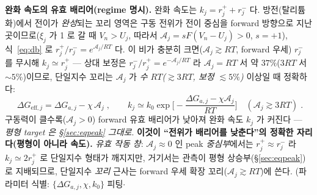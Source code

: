 \documentclass[11pt,a4paper]{article}
\newcommand{\eff}{\mathrm{eff}}
\begin{document}
\textbf{완화 속도의 유효 배리어(regime 명시).} 완화 속도는 $k_j=r_j^++r_j^-$ 다. 방전(탈리튬화)에서 전이가
\emph{완성}되는 꼬리 영역은 구동 전위가 전이 중심을 forward 방향으로 지난 곳이므로($\xi_j$ 가 1 로 갈 때
$V_n>U_j$, 따라서 $\mathcal A_j=sF(V_n-U_j)>0$, $s=+1$), 식~\eqref{eq:db} 로 $r_j^+/r_j^-=e^{\mathcal A_j/RT}$ 다.
이 비가 충분히 크면($\mathcal A_j\gtrsim RT$, forward 우세) $r_j^-$ 를 무시해 $k_j\simeq r_j^+$ — 상대 보정은
$r_j^-/r_j^+=e^{-\mathcal A_j/RT}$ 라 $\mathcal A_j=RT$ 서 약 $37\%$($3RT$ 서 $\sim5\%$)이므로, 단일지수 꼬리는 $\mathcal A_j$ 가
\emph{수 $RT$($\gtrsim3RT$, 보정 $\lesssim5\%$)} 이상일 때 정확하다:
\begin{equation}
\boxed{\;\Delta G_{\eff,j}=\Delta G_{a,j}-\chi\,\mathcal A_j\;,\qquad
k_j\simeq k_0\exp\!\Big[-\frac{\Delta G_{a,j}-\chi\mathcal A_j}{RT}\Big]\quad(\mathcal A_j\gtrsim 3RT)\;.}
\label{eq:keff}
\end{equation}
구동력이 클수록($\mathcal A_j>0$) forward 유효 배리어가 낮아져 완화 속도 $k_j$ 가 커진다 — \emph{평형 target 은
\S\ref{sec:eqpeak} 그대로}. \textbf{이것이 ``전위가 배리어를 낮춘다''의 정확한 자리다(평형이 아니라 속도).}
\emph{유효 작동 창}: $\mathcal A_j\approx0$ 인 peak \emph{중심부}에서는 $r_j^+\approx r_j^-$ 라 $k_j\simeq2r_j^+$ 로
단일지수 형태가 깨지지만, 거기서는 관측이 평형 상승부(\S\ref{sec:eqpeak})로 지배되므로, 단일지수 \emph{꼬리}
근사는 forward 우세 확장 꼬리($\mathcal A_j\gtrsim RT$)에 쓴다. (파라미터 식별: $\{\Delta G_{a,j},\chi,k_0\}$ 피팅$\cdot$
\end{document}
